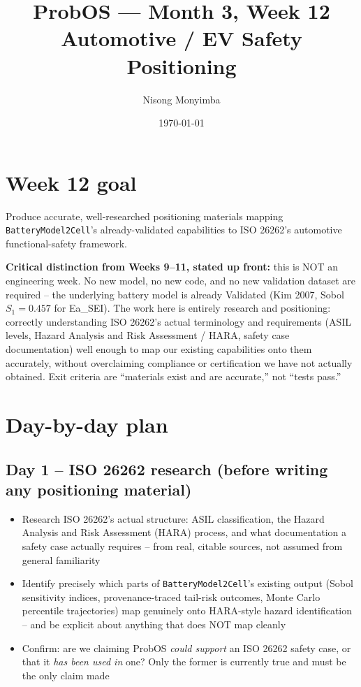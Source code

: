 \documentclass[11pt]{article}
\title{ProbOS --- Month 3, Week 12\\Automotive / EV Safety Positioning}
\author{Nisong Monyimba}
\date{\today}
\begin{document}
\maketitle

\section*{Week 12 goal}
Produce accurate, well-researched positioning materials mapping
\texttt{BatteryModel2Cell}'s already-validated capabilities to
ISO 26262's automotive functional-safety framework.

\textbf{Critical distinction from Weeks 9--11, stated up front:} this
is NOT an engineering week. No new model, no new code, and no new
validation dataset are required -- the underlying battery model is
already Validated (Kim 2007, Sobol $S_1=0.457$ for Ea\_SEI). The work
here is entirely research and positioning: correctly understanding
ISO 26262's actual terminology and requirements (ASIL levels, Hazard
Analysis and Risk Assessment / HARA, safety case documentation) well
enough to map our existing capabilities onto them accurately, without
overclaiming compliance or certification we have not actually
obtained. Exit criteria are ``materials exist and are accurate,'' not
``tests pass.''

\section*{Day-by-day plan}

\subsection*{Day 1 -- ISO 26262 research (before writing any positioning material)}
\begin{itemize}[leftmargin=*]
  \item Research ISO 26262's actual structure: ASIL classification,
    the Hazard Analysis and Risk Assessment (HARA) process, and what
    documentation a safety case actually requires -- from real,
    citable sources, not assumed from general familiarity
  \item Identify precisely which parts of \texttt{BatteryModel2Cell}'s
    existing output (Sobol sensitivity indices, provenance-traced
    tail-risk outcomes, Monte Carlo percentile trajectories) map
    genuinely onto HARA-style hazard identification -- and be
    explicit about anything that does NOT map cleanly
  \item Confirm: are we claiming ProbOS \emph{could support} an
    ISO 26262 safety case, or that it \emph{has been used in} one?
    Only the former is currently true and must be the only claim made
\end{itemize}
\end{document}
